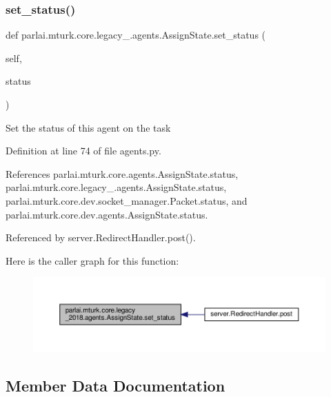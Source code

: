\subsubsection{\texorpdfstring{set\+\_\+status()}{set\_status()}}
{\footnotesize\ttfamily def parlai.\+mturk.\+core.\+legacy\+\_.\+agents.\+Assign\+State.\+set\+\_\+status (\begin{DoxyParamCaption}\item[{}]{self,  }\item[{}]{status }\end{DoxyParamCaption})}

\begin{DoxyVerb}Set the status of this agent on the task\end{DoxyVerb}
 

Definition at line 74 of file agents.\+py.



References parlai.\+mturk.\+core.\+agents.\+Assign\+State.\+status, parlai.\+mturk.\+core.\+legacy\+\_.\+agents.\+Assign\+State.\+status, parlai.\+mturk.\+core.\+dev.\+socket\+\_\+manager.\+Packet.\+status, and parlai.\+mturk.\+core.\+dev.\+agents.\+Assign\+State.\+status.



Referenced by server.\+Redirect\+Handler.\+post().

Here is the caller graph for this function\+:
\nopagebreak
\begin{figure}[H]
\begin{center}
\leavevmode
\includegraphics[width=350pt]{classparlai_1_1mturk_1_1core_1_1legacy__2018_1_1agents_1_1AssignState_a27ffbfa35ca00b8db0d0062aa476a65c_icgraph}
\end{center}
\end{figure}


\subsection{Member Data Documentation}
\mbox{\label{classparlai_1_1mturk_1_1core_1_1legacy__2018_1_1agents_1_1AssignState_a6b14225b614a29376d4d92ba03069780}} 
